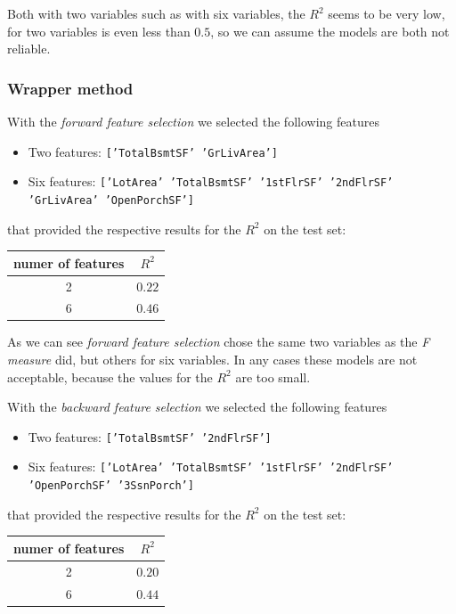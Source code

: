 \documentclass[a4paper,oneside,12pt]{article}
\begin{document}
Both with two variables such as with six variables, the $R^2$ seems to be very low, for two variables is even less than $0.5$, so we can assume the models are both not reliable.

\subsubsection{Wrapper method}

With the \textit{forward feature selection} we selected the following features 

\begin{itemize}
\item Two features: \texttt{['TotalBsmtSF' 'GrLivArea']} 
\item Six features:  \texttt{['LotArea' 'TotalBsmtSF' '1stFlrSF' '2ndFlrSF' 'GrLivArea' 'OpenPorchSF']}
\end{itemize}

that provided the respective results for the $R^2$ on the test set:
\begin{table}[H]
\centering
\begin{tabular}{|c|c|}
\hline
numer of features & $R^2$ \\
\hline
2  & $0.22$ \\
\hline
6  & $0.46$ \\
\hline

\end{tabular}
\end{table}

As we can see \textit{forward feature selection} chose the same two variables as the \textit{F measure} did, but others for six variables. In any cases these models are not acceptable, because the values for the $R^2$ are too small.

With the \textit{backward feature selection} we selected the following features 

\begin{itemize}
\item Two features: \texttt{['TotalBsmtSF' '2ndFlrSF']} 
\item Six features:  \texttt{['LotArea' 'TotalBsmtSF' '1stFlrSF' '2ndFlrSF' 'OpenPorchSF' '3SsnPorch']}
\end{itemize}

that provided the respective results for the $R^2$ on the test set:
\begin{table}[H]
\centering
\begin{tabular}{|c|c|}
\hline
numer of features & $R^2$ \\
\hline
2  & $0.20$ \\
\hline
6  & $0.44$ \\
\hline

\end{tabular}
\end{table}
\end{document}

